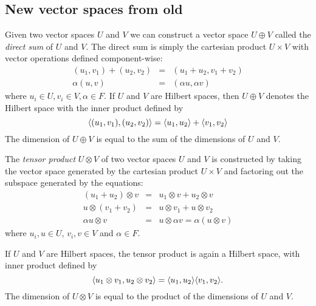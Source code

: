 \subsection{New vector spaces from old}
\label{new-vector-spaces}
\begin{defn}
Given two vector spaces $U$ and $V$ we can construct a vector space $U \oplus V$ called the \emph{direct sum} of $U$ and $V$. The direct sum is simply the cartesian product $U \times V$ with vector operations defined component-wise:
\begin{eqnarray*}
(u_1,v_1) + (u_2,v_2) & = & (u_1+u_2,v_1+v_2)\\
\alpha(u,v) & = & (\alpha u, \alpha v)
\end{eqnarray*}
where $u_i \in U, v_i \in V, \alpha \in F$. If $U$ and $V$ are Hilbert spaces, then $U \oplus V$ denotes the Hilbert space with the inner product defined by
$$\langle (u_1,v_1), (u_2,v_2) \rangle = \langle u_1, u_2 \rangle + \langle v_1, v_2 \rangle$$
The dimension of $U\oplus V$ is equal to the sum of the dimensions of $U$ and $V$.
\end{defn}
\begin{defn}
The \emph{tensor product} $U \otimes V$ of two vector spaces $U$ and $V$ is constructed by taking the vector space generated by the cartesian product $U \times V$ and factoring out the subspace generated by the equations:
\begin{eqnarray*}
(u_1 + u_2) \otimes v & = & u_1 \otimes v + u_2 \otimes v\\
u \otimes (v_1 + v_2) & = & u \otimes v_1 + u \otimes v_2\\
\alpha u\otimes v & =  &u \otimes \alpha v = \alpha(u \otimes v) 
\end{eqnarray*}
where $u_i,u \in U$, $v_i,v \in V$ and $\alpha \in F$.

If $U$ and $V$ are Hilbert spaces, the tensor product is again a Hilbert space, with inner product defined by
$$\langle u_1\otimes v_1, u_2 \otimes v_2 \rangle = \langle u_1, u_2 \rangle\langle v_1, v_2 \rangle.$$
The dimension of $U \otimes V$ is equal to the product of the dimensions of $U$ and $V$.
\end{defn}

